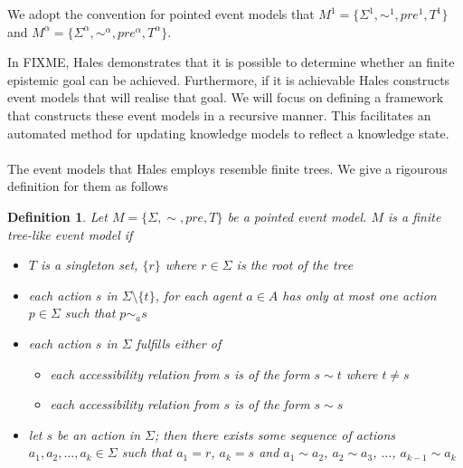 \documentclass[12pt, a4paper, titlepage]{scrartcl}
\newtheorem{defn}{Definition}
\begin{document}
We adopt the convention for pointed event models that $M^1 = \{\Sigma^1, \sim^1,
pre^1, T^1\}$ and $M^\alpha = \{\Sigma^\alpha,\sim^\alpha,pre^\alpha,T^\alpha\}$.

In FIXME, Hales demonstrates that it is possible to determine whether an
finite epistemic goal can be achieved.
Furthermore, if it is achievable Hales constructs event models that will realise
that goal.
We will focus on defining a framework that constructs these event models in a
recursive manner.
This facilitates an automated method for updating knowledge models to reflect a
knowledge state.\\
\\
The event models that Hales employs resemble finite trees.
We give a rigourous definition for them as follows
\begin{defn} \label{finTree}
Let $M = \{\Sigma, \sim, pre, T \}$ be a pointed event model.
$M$ is a finite tree-like event model if
\begin{itemize}
	\item $T$ is a singleton set, $\{ r \}$ where $r \in \Sigma$ is the root of the tree
	\item each action $s$ in $\Sigma \setminus \{ t \}$, for each agent $a \in A$ has only at most 
	one action $p \in \Sigma$ such that $p \sim_a s$
	\item each action $s$ in $\Sigma$ fulfills either of
	\begin{itemize}
		\item each accessibility relation from $s$ is of the form $s \sim t$ where $t \neq s$
		\item each accessibility relation from $s$ is of the form $s \sim s$
	\end{itemize}
	\item let $s$ be an action in $\Sigma$; then there exists some sequence of actions $a_1, a_2,
	\ldots, a_k \in \Sigma$ such that $a_1 = r$, $a_k = s$ and $a_1 \sim a_2$, $a_2 \sim a_3$,
	$\ldots$, $a_{k-1} \sim a_k$
\end{itemize}
\end{defn}
\end{document}
